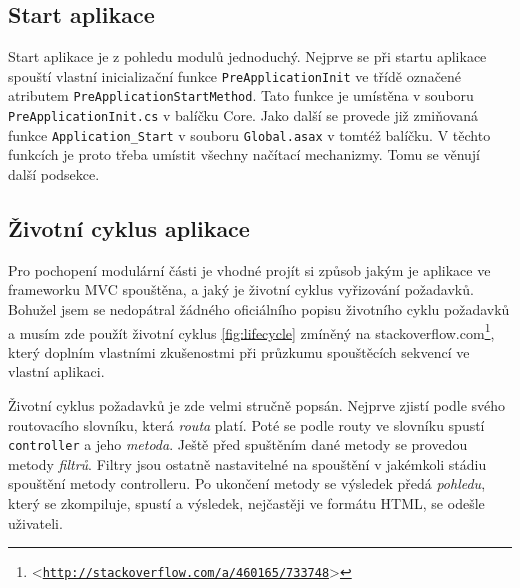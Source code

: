 \documentclass[11pt,twoside,a4paper]{book}
\let\oldUrl\url
\renewcommand\url[1]{<\texttt{\oldUrl{#1}}>}
\begin{document}
\subsection{Start aplikace}
\label{sec:startapp}
Start aplikace je z pohledu modulů jednoduchý. Nejprve se při startu aplikace spouští vlastní inicializační funkce \texttt{PreApplicationInit} ve třídě označené atributem \texttt{Pre\-Application\-Start\-Method}. Tato funkce je umístěna v souboru \texttt{PreApplicationInit.cs} v balíčku \textsf{Core}. Jako další se provede již zmiňovaná funkce \texttt{Application\_Start} v souboru \texttt{Global.asax} v tomtéž balíčku. V těchto funkcích je proto třeba umístit všechny načítací mechanizmy. Tomu se věnují další podsekce.

\subsection{Životní cyklus aplikace}
Pro pochopení modulární části je vhodné projít si způsob jakým je aplikace ve frameworku MVC spouštěna, a jaký je životní cyklus vyřizování požadavků. Bohužel jsem se nedopátral žádného oficiálního popisu životního cyklu požadavků a musím zde použít životní cyklus \ref{fig:lifecycle} zmíněný na stackoverflow.com\footnote{\url{http://stackoverflow.com/a/460165/733748}}, který doplním vlastními zkušenostmi při průzkumu spouštěcích sekvencí ve vlastní aplikaci. 

Životní cyklus požadavků je zde velmi stručně popsán. Nejprve zjistí podle svého routovacího slovníku, která \textit{routa} platí. Poté se podle routy ve slovníku spustí \texttt{controller} a jeho \textit{metoda}. Ještě před spuštěním dané metody se provedou metody \textit{filtrů}. Filtry jsou ostatně nastavitelné na spouštění v jakémkoli stádiu spouštění metody controlleru. Po ukončení metody se výsledek předá \textit{pohledu}, který se zkompiluje, spustí a výsledek, nejčastěji ve formátu HTML, se odešle uživateli.
\end{document}
